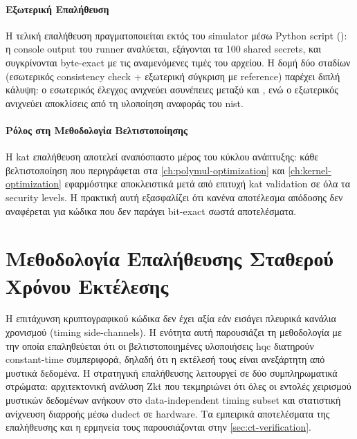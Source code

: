 \paragraph{Εξωτερική Επαλήθευση}

Η τελική επαλήθευση πραγματοποιείται εκτός του simulator μέσω Python script
(): η console output του runner αναλύεται, εξάγονται τα
\num{100} shared secrets, και συγκρίνονται byte-exact με τις αναμενόμενες τιμές
του  αρχείου. Η δομή δύο σταδίων (εσωτερικός consistency check +
εξωτερική σύγκριση με reference) παρέχει διπλή κάλυψη: ο εσωτερικός έλεγχος
ανιχνεύει ασυνέπειες μεταξύ \Encaps και \Decaps, ενώ ο εξωτερικός ανιχνεύει
αποκλίσεις από τη υλοποίηση αναφοράς του \gls{nist}.

\paragraph{Ρόλος στη Μεθοδολογία Βελτιστοποίησης}

Η \gls{kat} επαλήθευση αποτελεί αναπόσπαστο μέρος του κύκλου ανάπτυξης: κάθε
βελτιστοποίηση που περιγράφεται στα \cref{ch:polymul-optimization} και
\cref{ch:kernel-optimization} εφαρμόστηκε αποκλειστικά μετά από επιτυχή
\gls{kat} validation σε όλα τα security levels. Η πρακτική αυτή εξασφαλίζει
ότι κανένα αποτέλεσμα απόδοσης δεν αναφέρεται για κώδικα που δεν παράγει
bit-exact σωστά αποτελέσματα.

\ifTODO
\section{Μεθοδολογία Επαλήθευσης Σταθερού Χρόνου Εκτέλεσης}
\label{sec:ct-methodology}

Η επιτάχυνση κρυπτογραφικού κώδικα δεν έχει αξία εάν εισάγει πλευρικά
κανάλια χρονισμού (timing side-channels). Η ενότητα αυτή παρουσιάζει τη μεθοδολογία με την οποία επαληθεύεται ότι
οι βελτιστοποιημένες υλοποιήσεις \gls{hqc} διατηρούν constant-time συμπεριφορά,
δηλαδή ότι η εκτέλεσή τους είναι ανεξάρτητη από μυστικά δεδομένα. Η στρατηγική
επαλήθευσης λειτουργεί σε δύο συμπληρωματικά στρώματα: αρχιτεκτονική ανάλυση Zkt που τεκμηριώνει ότι όλες οι εντολές χειρισμού
μυστικών δεδομένων ανήκουν στο data-independent timing subset
και στατιστική ανίχνευση διαρροής μέσω dudect σε hardware. Τα
εμπειρικά αποτελέσματα της επαλήθευσης και η ερμηνεία τους παρουσιάζονται
στην \cref{sec:ct-verification}.

